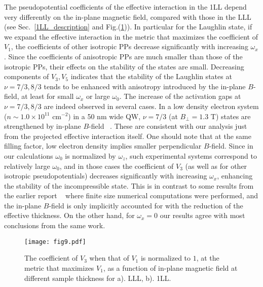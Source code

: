 \documentclass[twocolumn,showpacs,amsmath,amstex,amssymb,mathfonts,prb]{revtex4-1}
\begin{document}
The pseudopotential coefficients of the effective interaction in the 1LL depend very differently on the in-plane magnetic field, compared with those in the LLL (see Sec.~\ref{1LL_description} and Fig.(\ref{LLLvs1LL})). In particular for the Laughlin state, if we expand the effective interaction in the metric that maximizes the coefficient of $V_1$, the coefficients of other isotropic PPs decrease significantly with increasing $\omega_x$. Since the coefficients of anisotropic PPs are much smaller than those of the isotropic PPs, their effects on the stability of the states are small. Decreasing components of $V_3, V_5$ indicates that the stability of the Laughlin states at $\nu=7/3,8/3$ tends to be enhanced with anisotropy introduced by the in-plane $B$-field, at least for small $\omega_x$ or large $\omega_0$. The increase of the activation gaps at $\nu = 7/3, 8/3$ are indeed observed in several cases\cite{dean08,chi12, chithesis}. In a low density electron system ($n \sim 1.0 \times 10^{11}$ cm$^{-2}$) in a 50 nm wide QW, $\nu = 7/3$ (at $B_{\perp} = 1.3 $ T) states are strengthened by in-plane $B$-field ~\cite{chi12}.
These are consistent with our analysis just from the projected effective interaction itself. One should note that at the same filling factor, low electron density implies smaller perpendicular $B$-field. Since in our calculations $\omega_0$ is normalized by $\omega_z$, such experimental systems correspond to relatively large $\omega_0$, and in those cases the coefficient of $V_3$ (as well as for other isotropic pseudopotentials) decreases significantly with increasing $\omega_x$, enhancing the stability of the incompressible state. This is in contrast to some results from the earlier report ~\cite{peterson08} where finite size numerical computations were performed, and the in-plane $B$-field is only implicitly accounted for with the reduction of the effective thickness.
On the other hand, for $\omega_x=0$ our results agree with most conclusions from the same work\cite{peterson08}.
\begin{figure}[htb]
\texttt{[image: fig9.pdf]}
\caption{The coefficient of $V_3$ when that of $V_1$ is normalized to $1$, at the metric that maximizes $V_1$, as a function of in-plane magnetic field at different sample thickness for a). LLL, b). 1LL.}
\label{LLLvs1LL}
\end{figure}
\end{document}

